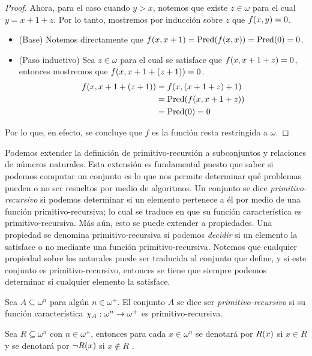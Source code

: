 \begin{proof}
	Ahora, para el caso cuando $y > x$, notemos que existe $z\in\omega$ para el cual $y = x + 1 + z$. Por lo tanto, mostremos por inducción sobre $z$ que $f\pa*{x, y} = 0$.

	\begin{itemize}
		\item (Base) Notemos directamente que $f\pa*{x, x + 1} =\mathrm{Pred}\pa*{f\pa*{x, x}} =\mathrm{Pred}\pa*{0} = 0$.
		\item (Paso inductivo) Sea $z\in\omega$ para el cual se satisface que $f\pa*{x, x + 1 + z} = 0$, entonces mostremos que $f\pa*{x, x + 1 +\pa*{z + 1}} = 0$.
		\begin{align*}
			f\pa*{x, x + 1 +\pa*{z + 1}}
			&= f\pa*{x,\pa*{x + 1 + z} + 1}\\
			&=\mathrm{Pred}\pa*{f\pa*{x, x + 1 + z}}\\
			&=\mathrm{Pred}\pa*{0} = 0
		\end{align*}
	\end{itemize}

	Por lo que, en efecto, se concluye que $f$ es la función resta restringida a $\omega$.
\end{proof}

Podemos extender la definición de primitivo-recursión a subconjuntos y relaciones de números naturales. Esta extensión es fundamental puesto que saber si podemos computar un conjunto es lo que nos permite determinar qué problemas pueden o no ser resueltos por medio de algoritmos. Un conjunto se dice \emph{primitivo-recursivo} si podemos determinar si un elemento pertenece a él por medio de una función primitivo-recursiva; lo cual se traduce en que su función característica es primitivo-recursiva. Más aún, esto se puede extender a propiedades. Una propiedad se denomina primitivo-recursiva si podemos \emph{decidir} si un elemento la satisface o no mediante una función primitivo-recursiva. Notemos que cualquier propiedad sobre los naturales puede ser traducida al conjunto que define, y si este conjunto es primitivo-recursivo, entonces se tiene que siempre podemos determinar si cualquier elemento la satisface.

\begin{definition}
	Sea $A\subseteq\omega^{n}$ para algún $n\in\omega^{+}$. El conjunto $A$ se dice ser \emph{primitivo-recursivo} si su función característica $\chi_{A}:\omega^{n}\to\omega^{+}$ es primitivo-recursiva.
\end{definition}

\begin{notation}
	Sea $R\subseteq\omega^{n}$ con $n\in\omega^{+}$, entonces para cada $x\in\omega^{n}$ se denotará por $R\pa*{x}$ si $x\in R$ y se denotará por $\lnot R\pa*{x}$ si $x\notin R$ .
\end{notation}

